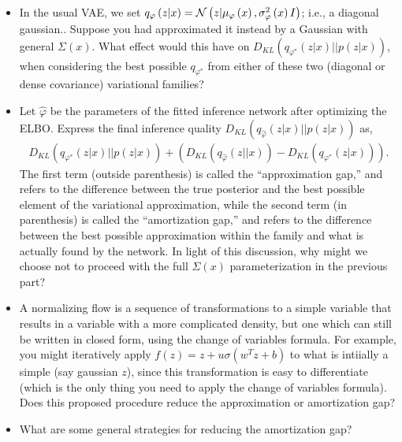 \documentclass{article}
\begin{document}
\begin{enumerate}
  \begin{itemize}
  \item In the usual VAE, we set $q_{\varphi}\left(z \vert x\right) =
    \mathcal{N}\left(z \vert \mu_{\varphi}\left(x\right),
    \sigma_{\varphi}^{2}\left(x\right)I\right)$; i.e., a diagonal gaussian..
    Suppose you had approximated it instead by a Gaussian with general
    $\Sigma\left(x\right)$. What effect would this have on
    $D_{KL}\left(q_{\varphi^{\ast}}\left(z \vert x\right) \vert \vert p\left(z
    \vert x\right)\right)$, when considering the best possible
    $q_{\varphi^\ast}$ from either of these two (diagonal or dense covariance)
    variational families?
  \item Let $\hat{\varphi}$ be the parameters of the fitted inference network
    after optimizing the ELBO. Express the final inference quality
    $D_{KL}\left(q_{\hat{\varphi}}\left(z \vert x\right) \vert \vert p\left(z
    \vert x\right)\right)$ as,
    \begin{align*}
      D_{KL}\left(q_{\varphi^{\ast}}\left(z \vert x\right) \vert \vert p\left(z
      \vert x\right)\right) + \left(D_{KL}\left(q_{\hat{\varphi}}\left(z \vert
      \vert x\right)\right) - D_{KL}\left(q_{\varphi^{\ast}}\left(z \vert x
        \right)\right)\right).
    \end{align*}
    The first term (outside parenthesis) is called the ``approximation gap,''
    and refers to the difference between the true posterior and the best
    possible element of the variational approximation, while the second term (in
    parenthesis) is called the ``amortization gap,'' and refers to the
    difference between the best possible approximation within the family and
    what is actually found by the network. In light of this discussion, why
    might we choose not to proceed with the full $\Sigma\left(x\right)$
    parameterization in the previous part?
  \item A normalizing flow is a sequence of transformations to a simple variable
    that results in a variable with a more complicated density, but one which
    can still be written in closed form, using the change of variables formula.
    For example, you might iteratively apply $f\left(z\right) = z +
    u\sigma\left(w^T z + b\right)$ to what is intiially a simple (say gaussian
    $z$), since this transformation is easy to differentiate (which is the only
    thing you need to apply the change of variables formula). Does this proposed
    procedure reduce the approximation or amortization gap?
  \item What are some general strategies for reducing the amortization gap?
  \end{itemize}
\end{enumerate}
\end{document}
